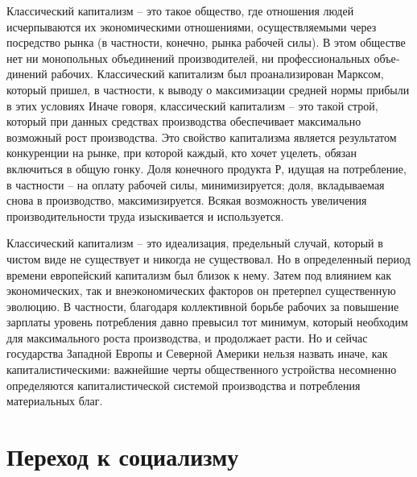 \documentclass{book}
\begin{document}
Классический капитализм -- это такое общество, где отно­шения людей исчерпываются  их экономическими отношениями, осуществляемыми через посредство рынка (в частности, конеч­но, рынка рабочей силы). В этом обществе нет ни монополь­ных объединений производителей, ни профессиональных объе­динений рабочих. Классический капитализм был проанализи­рован Марксом, который пришел, в частности, к выводу о мак­симизации средней нормы прибыли в этих условиях Иначе го­воря, классический капитализм -- это такой строй, который при данных средствах производства обеспечивает максималь­но возможный рост производства. Это свойство капитализма является результатом конкуренции на рынке, при которой каж­дый, кто хочет уцелеть, обязан включиться в общую гонку. Доля конечного продукта Р, идущая на потребление, в част­ности -- на оплату рабочей силы, минимизируется; доля, вкла­дываемая снова в производство, максимизируется. Всякая воз­можность увеличения производительности труда изыскивает­ся и используется.

Классический капитализм -- это идеализация, предельный случай, который в чистом виде не существует и никогда не су­ществовал. Но в определенный период времени европейский капитализм был близок к нему. Затем под влиянием как эко­номических, так и внеэкономических факторов он претерпел существенную эволюцию. В частности, благодаря коллективной борьбе рабочих за повышение зарплаты уровень потребления давно превысил тот минимум, который необходим для макси­мального роста производства, и продолжает расти. Но и сейчас государства Западной Европы и Северной Америки нельзя наз­вать иначе, как капиталистическими: важнейшие черты общест­венного устройства несомненно определяются капиталистиче­ской системой производства и потребления материальных благ.



\section{Переход к социализму}
\end{document}

